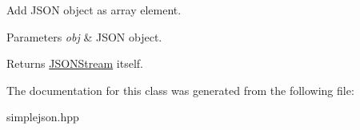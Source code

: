 Add J\+S\+O\+N object as array element. 


\begin{DoxyParams}{Parameters}
{\em obj} & J\+S\+O\+N object.\\
\hline
\end{DoxyParams}
\begin{DoxyReturn}{Returns}
\hyperlink{class_simple_j_s_o_n_1_1_j_s_o_n_stream}{J\+S\+O\+N\+Stream} itself. 
\end{DoxyReturn}


The documentation for this class was generated from the following file\+:\begin{DoxyCompactItemize}
\item 
simplejson.\+hpp\end{DoxyCompactItemize}

